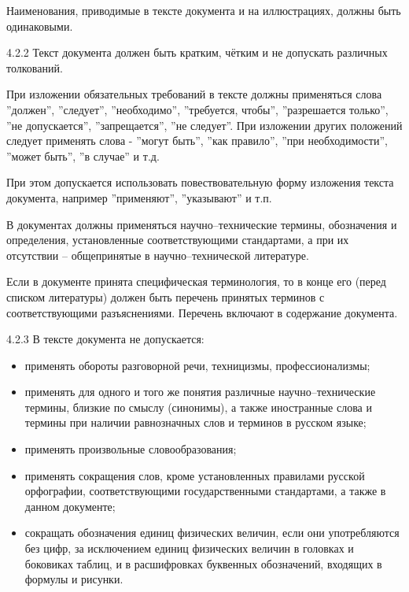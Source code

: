 Наименования, приводимые в тексте документа и на иллюстрациях, должны быть одинаковыми.

4.2.2 Текст документа должен быть кратким, чётким и не допускать различных толкований.

При изложении обязательных требований в тексте должны применяться слова ''должен'', ''следует'', ''необходимо'', ''требуется, чтобы'', ''разрешается только'', ''не допускается'', ''запрещается'', ''не следует''. При изложении других положений следует применять слова - ''могут быть'', ''как правило'', ''при необходимости'',
''может быть'', ''в случае'' и т.д.

При этом допускается использовать повествовательную форму изложения текста документа, например ''применяют'', ''указывают'' и т.п.

В документах должны применяться научно–технические термины, обозначения и определения, установленные соответствующими стандартами, а при их отсутствии – общепринятые в научно–технической литературе.

Если в документе принята специфическая терминология, то в конце его (перед списком литературы) должен быть перечень принятых терминов с соответствующими разъяснениями. Перечень включают в содержание документа.

4.2.3 В тексте документа не допускается:
\begin{itemize}
  \item применять обороты разговорной речи, техницизмы, профессионализмы;
  \item применять для одного и того же понятия различные научно–технические термины, близкие по смыслу (синонимы), а также иностранные слова и термины при наличии равнозначных слов и терминов в русском языке;
  \item применять произвольные словообразования;
  \item применять сокращения слов, кроме установленных правилами русской орфографии, соответствующими государственными стандартами, а также в данном документе;
  \item сокращать обозначения единиц физических величин, если они употребляются без цифр, за исключением единиц физических величин в головках и боковиках таблиц, и в расшифровках буквенных обозначений, входящих в формулы и рисунки.
\end{itemize}


